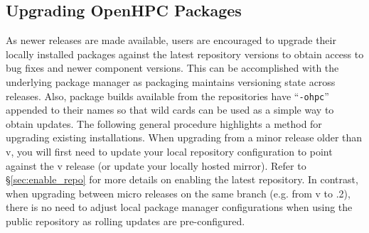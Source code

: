 \subsection{Upgrading OpenHPC Packages}  \label{appendix:upgrade}


As newer \OHPC{} releases are made available, users are encouraged to upgrade
their locally installed packages against the latest repository versions to
obtain access to bug fixes and newer component versions. This can be
accomplished with the underlying package manager as \OHPC{} packaging maintains
versioning state across releases. Also, package builds available from the
\OHPC{} repositories have ``\texttt{-ohpc}'' appended to their names so that
wild cards can be used as a simple way to obtain updates. The following general
procedure highlights a method for upgrading existing installations.
When upgrading from a minor release older than v\OHPCVerTree{}, you will first
need to update your local \OHPC{} repository configuration to point against the
v\OHPCVerTree{} release (or update your locally hosted mirror). Refer to
\S\ref{sec:enable_repo} for more details on enabling the latest
repository. In contrast, when upgrading between micro releases on the same
branch (e.g. from v\OHPCVerTree{} to \OHPCVerTree{}.2), there is no need to
adjust local package manager configurations when using the public repository as
rolling updates are pre-configured.

